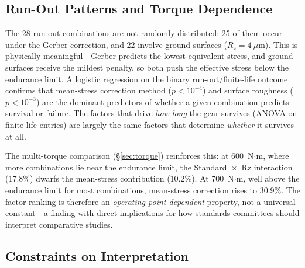\documentclass[12pt,a4paper]{article}
\begin{document}
\subsection{Run-Out Patterns and Torque Dependence}

The 28 run-out combinations are not randomly distributed: 25 of them
occur under the Gerber correction, and 22 involve ground surfaces
($R_z = 4~\mu$m). This is physically meaningful---Gerber predicts the
lowest equivalent stress, and ground surfaces receive the mildest
penalty, so both push the effective stress below the endurance limit.
A logistic regression on the binary run-out/finite-life outcome
confirms that mean-stress correction method ($p < 10^{-4}$) and
surface roughness ($p < 10^{-3}$) are the dominant predictors of
whether a given combination predicts survival or failure. The factors
that drive \emph{how long} the gear survives (ANOVA on finite-life
entries) are largely the same factors that determine \emph{whether} it
survives at all.

The multi-torque comparison (\S\ref{sec:torque}) reinforces this:
at 600~N$\cdot$m, where more combinations lie near the endurance
limit, the Standard~$\times$~Rz interaction (17.8\%) dwarfs the
mean-stress contribution (10.2\%). At 700~N$\cdot$m, well above the
endurance limit for most combinations, mean-stress correction rises to
30.9\%. The factor ranking is therefore an \emph{operating-point-dependent}
property, not a universal constant---a finding with direct implications
for how standards committees should interpret comparative studies.

\subsection{Constraints on Interpretation}
\end{document}

